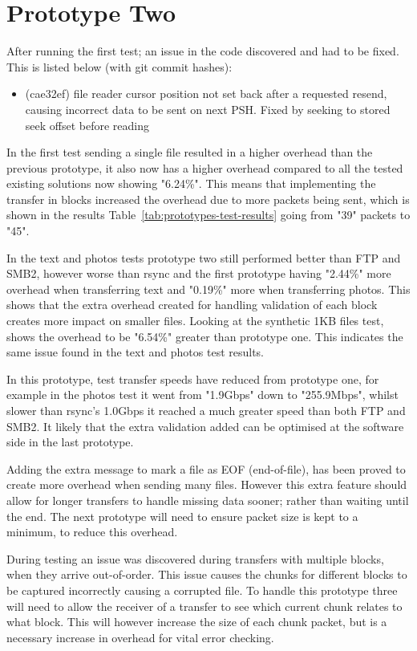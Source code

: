 \section{Prototype Two}
After running the first test; an issue in the code discovered and had to be fixed. This is listed below (with git commit hashes):

\begin{itemize}
    \item (cae32ef) file reader cursor position not set back after a requested resend, causing incorrect data to be sent on next PSH. Fixed by seeking to stored seek offset before reading
\end{itemize}

In the first test sending a single file resulted in a higher overhead than the previous prototype, it also now has a higher overhead compared to all the tested existing solutions now showing "6.24\%". This means that implementing the transfer in blocks increased the overhead due to more packets being sent, which is shown in the results Table~\ref{tab:prototypes-test-results} going from "39" packets to "45".

In the text and photos tests prototype two still performed better than FTP and SMB2, however worse than rsync and the first prototype having "2.44\%" more overhead when transferring text and "0.19\%" more when transferring photos. This shows that the extra overhead created for handling validation of each block creates more impact on smaller files. Looking at the synthetic 1KB files test, shows the overhead to be "6.54\%" greater than prototype one. This indicates the same issue found in the text and photos test results.

In this prototype, test transfer speeds have reduced from prototype one, for example in the photos test it went from "1.9Gbps" down to "255.9Mbps", whilst slower than rsync's 1.0Gbps it reached a much greater speed than both FTP and SMB2. It likely that the extra validation added can be optimised at the software side in the last prototype.

Adding the extra message to mark a file as EOF (end-of-file), has been proved to create more overhead when sending many files. However this extra feature should allow for longer transfers to handle missing data sooner; rather than waiting until the end. The next prototype will need to ensure packet size is kept to a minimum, to reduce this overhead.

During testing an issue was discovered during transfers with multiple blocks, when they arrive out-of-order. This issue causes the chunks for different blocks to be captured incorrectly causing a corrupted file. To handle this prototype three will need to allow the receiver of a transfer to see which current chunk relates to what block. This will however increase the size of each chunk packet, but is a necessary increase in overhead for vital error checking.

